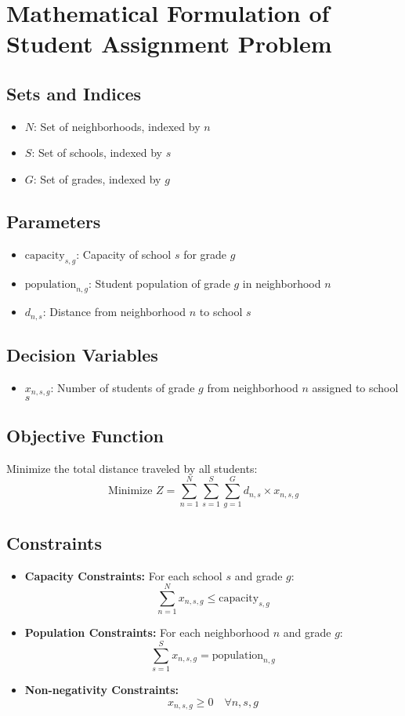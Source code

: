 \documentclass{article}
\begin{document}
\section*{Mathematical Formulation of Student Assignment Problem}

\subsection*{Sets and Indices}
\begin{itemize}
    \item \( N \): Set of neighborhoods, indexed by \( n \)
    \item \( S \): Set of schools, indexed by \( s \)
    \item \( G \): Set of grades, indexed by \( g \)
\end{itemize}

\subsection*{Parameters}
\begin{itemize}
    \item \( \text{capacity}_{s,g} \): Capacity of school \( s \) for grade \( g \)
    \item \( \text{population}_{n,g} \): Student population of grade \( g \) in neighborhood \( n \)
    \item \( d_{n,s} \): Distance from neighborhood \( n \) to school \( s \)
\end{itemize}

\subsection*{Decision Variables}
\begin{itemize}
    \item \( x_{n,s,g} \): Number of students of grade \( g \) from neighborhood \( n \) assigned to school \( s \)
\end{itemize}

\subsection*{Objective Function}
Minimize the total distance traveled by all students:
\[
\text{Minimize } Z = \sum_{n=1}^{N} \sum_{s=1}^{S} \sum_{g=1}^{G} d_{n,s} \times x_{n,s,g}
\]

\subsection*{Constraints}
\begin{itemize}
    \item \textbf{Capacity Constraints:} For each school \( s \) and grade \( g \):
    \[
    \sum_{n=1}^{N} x_{n,s,g} \leq \text{capacity}_{s,g}
    \]
    \item \textbf{Population Constraints:} For each neighborhood \( n \) and grade \( g \):
    \[
    \sum_{s=1}^{S} x_{n,s,g} = \text{population}_{n,g}
    \]
    \item \textbf{Non-negativity Constraints:}
    \[
    x_{n,s,g} \geq 0 \quad \forall n, s, g
    \]
\end{itemize}
\end{document}
